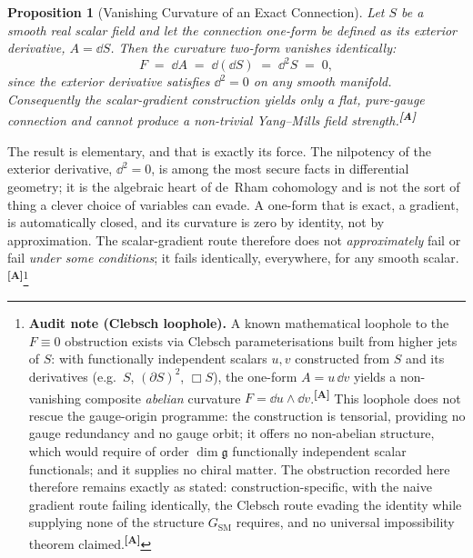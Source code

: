 \documentclass[12pt,a4paper,twoside]{article}
\theoremstyle{plain}
\newtheorem{proposition}[theorem]{Proposition}
\theoremstyle{definition}
\theoremstyle{remark}
\newcommand{\catmark}[1]{\textsuperscript{\textsf{\textbf{[#1]}}}}
\begin{document}
\begin{proposition}[Vanishing Curvature of an Exact Connection]
\label{prop:d2-obstruction}
Let $S$ be a smooth real scalar field and let the connection one-form be defined as its exterior derivative, $A = \dd S$. Then the curvature two-form vanishes identically:
\[
 F \;=\; \dd A \;=\; \dd(\dd S) \;=\; \dd^2 S \;=\; 0,
\]
since the exterior derivative satisfies $\dd^2 = 0$ on any smooth manifold. Consequently the scalar-gradient construction yields only a flat, pure-gauge connection and cannot produce a non-trivial Yang--Mills field strength.\catmark{A}
\end{proposition}

\noindent The result is elementary, and that is exactly its force. The nilpotency of the exterior derivative, $\dd^2 = 0$, is among the most secure facts in differential geometry; it is the algebraic heart of de~Rham cohomology and is not the sort of thing a clever choice of variables can evade. A one-form that is exact, a gradient, is automatically closed, and its curvature is zero by identity, not by approximation. The scalar-gradient route therefore does not \emph{approximately} fail or fail \emph{under some conditions}; it fails identically, everywhere, for any smooth scalar.\catmark{A}\footnote{\textbf{Audit note (Clebsch loophole).} A known mathematical loophole to the $F \equiv 0$ obstruction exists via Clebsch parameterisations built from higher jets of $S$: with functionally independent scalars $u,v$ constructed from $S$ and its derivatives (e.g.\ $S$, $(\partial S)^2$, $\Box S$), the one-form $A = u\,\dd v$ yields a non-vanishing composite \emph{abelian} curvature $F = \dd u \wedge \dd v$.\catmark{A} This loophole does not rescue the gauge-origin programme: the construction is tensorial, providing no gauge redundancy and no gauge orbit; it offers no non-abelian structure, which would require of order $\dim\mathfrak{g}$ functionally independent scalar functionals; and it supplies no chiral matter. The obstruction recorded here therefore remains exactly as stated: construction-specific, with the naive gradient route failing identically, the Clebsch route evading the identity while supplying none of the structure $G_{\mathrm{SM}}$ requires, and no universal impossibility theorem claimed.\catmark{A}}
\end{document}
